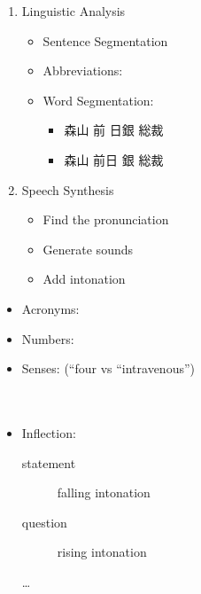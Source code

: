 \documentclass[a4paper,landscape,headrule,footrule,xetex]{foils}
\begin{document}
\begin{enumerate}
\item Linguistic Analysis
  \begin{itemize}
  \item Sentence Segmentation
  \item Abbreviations: 
  \item Word Segmentation: 
    \begin{itemize}
    \item 森山 前 日銀 総裁 
    \item[\Bad]  森山 前日 銀 総裁　
      \end{itemize}
    \end{itemize}
\item Speech Synthesis
  \begin{itemize}
  \item Find the pronunciation
  \item Generate sounds
  \item Add intonation
  \end{itemize}
\end{enumerate}


\begin{itemize}
\item Acronyms: 
\item Numbers: 
\item Senses:  (``four vs ``intravenous'')
  \\ 
\\ 
\\ 
\item Inflection:
  \begin{description}
  \item[statement] falling intonation
  \item[question] rising intonation
  \item[{\ldots}]
  \end{description}
\end{itemize}
\end{document}
